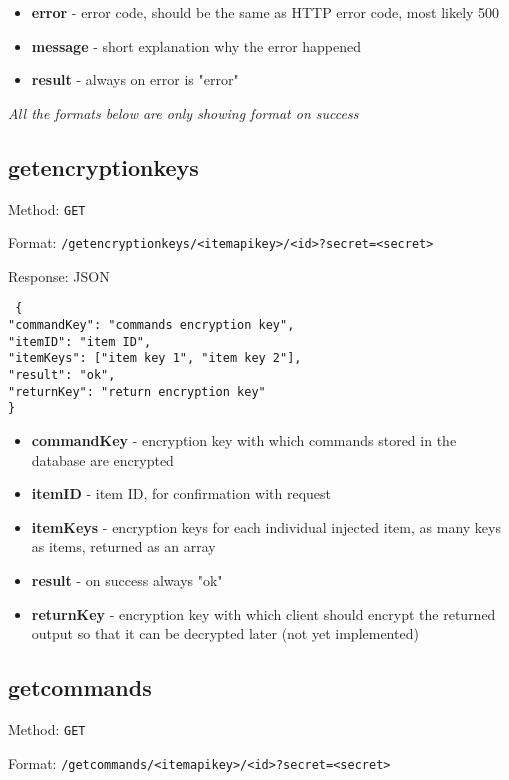 \begin{itemize}
  \item \textbf{error} - error code, should be the same as HTTP error code, most likely 500
  \item \textbf{message} - short explanation why the error happened
  \item \textbf{result} - always on error is "error"
\end{itemize}

\emph{All the formats below are only showing format on success}

\subsection{getencryptionkeys}
Method: \texttt{GET}

Format: \texttt{/getencryptionkeys/<itemapikey>/<id>?secret=<secret>}

Response: JSON

\texttt{
  \{ \\
    "commandKey": "commands encryption key", \\
    "itemID": "item ID", \\
    "itemKeys": ["item key 1", "item key 2"], \\
    "result": "ok",\\
    "returnKey": "return encryption key"\\
  \}
}

\begin{itemize}
  \item \textbf{commandKey} - encryption key with which commands stored in the database are encrypted
  \item \textbf{itemID} - item ID, for confirmation with request
  \item \textbf{itemKeys} - encryption keys for each individual injected item, as many keys as items, returned as an array
  \item \textbf{result} - on success always "ok"
  \item \textbf{returnKey} - encryption key with which client should encrypt the returned output so that it can be decrypted later (not yet implemented)
\end{itemize}


\subsection{getcommands}
Method: \texttt{GET}

Format: \texttt{/getcommands/<itemapikey>/<id>?secret=<secret>}

